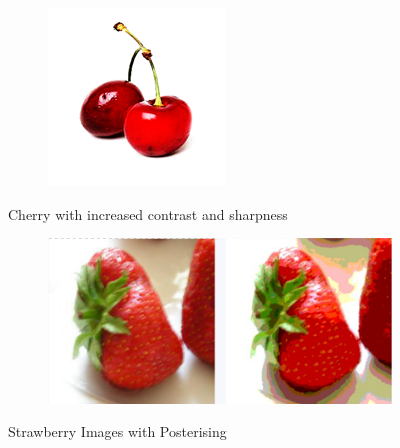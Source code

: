 \documentclass[../main.tex]{subfiles}
\begin{document}
\begin{figure}[h!]
\begin{subfigure}[b]{0.2\linewidth}
    \includegraphics[width=\linewidth]{01-Contrast-Sharpness/edited.png}
  \end{subfigure}
  \caption{Cherry with increased contrast and sharpness}
  \label{fig:contrast-edit}
\end{figure}

\begin{figure}[h!]
  \centering
  \begin{subfigure}[b]{0.5\linewidth}
    \includegraphics[width=\linewidth]{02-Posterising/strawberry.png}
  \end{subfigure}
  \caption{Strawberry Images with Posterising}
  \label{fig:strawberry-postering-edit}
\end{figure}
\end{document}
